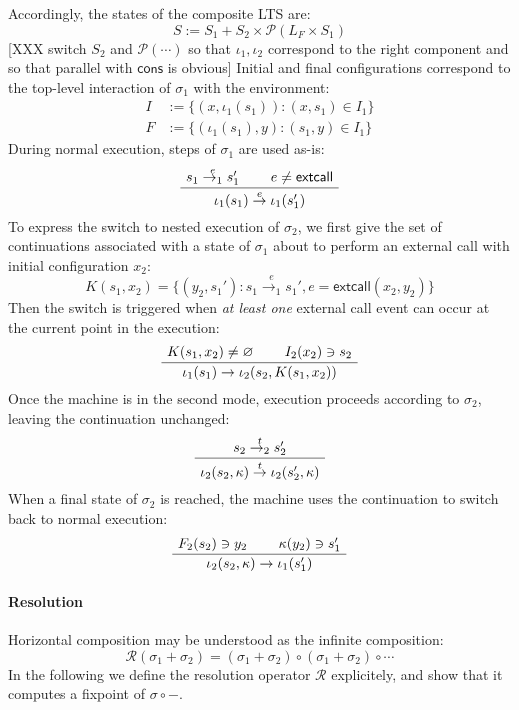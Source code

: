 \documentclass[sigplan,10pt,review,anonymous]{acmart}
\newcommand{\kw}[1]{\ensuremath{ \textsf{#1} }}
\begin{document}
Accordingly,
the states of the composite LTS are:
\[
  S := S_1 + S_2 \times \mathcal{P}(L_F \times S_1)
\]
[XXX switch $S_2$ and $\mathcal{P}(\cdots)$ so that
$\iota_1, \iota_2$ correspond to the right component
and so that parallel with $\kw{cons}$ is obvious]
%
Initial and final configurations
correspond to the top-level interaction of $\sigma_1$ with the environment:
\begin{align*}
  I &:= \{ (x, \iota_1(s_1)) : (x, s_1) \in I_1 \} \\
  F &:= \{ (\iota_1(s_1), y) : (s_1, y) \in I_1 \}
\end{align*}
During normal execution,
steps of $\sigma_1$ are used as-is:
\[
  \AxiomC{$s_1 \stackrel{e}{\rightarrow_1} s_1'$}
  \AxiomC{$e \ne \kw{extcall}$}
  \BinaryInfC{$\iota_1(s_1) \stackrel{e}{\rightarrow} \iota_1(s_1')$}
  \DisplayProof
\]
To express the switch to nested execution of $\sigma_2$,
we first give the set of continuations associated with a state of $\sigma_1$
about to perform an external call with initial configuration $x_2$:
\[
  K(s_1, x_2) =
    \{ (y_2, s_1') : s_1 \stackrel{e}{\rightarrow_1} s_1',
                     e = \kw{extcall}(x_2, y_2) \}
\]
Then the switch is triggered when \emph{at least one} external call event
can occur at the current point in the execution:
\[
  \AxiomC{$K(s_1, x_2) \ne \varnothing$}
  \AxiomC{$I_2(x_2) \ni s_2$}
  \BinaryInfC{$\iota_1(s_1) \rightarrow \iota_2(s_2, K(s_1, x_2))$}
  \DisplayProof
\]
Once the machine is in the second mode,
execution proceeds according to $\sigma_2$,
leaving the continuation unchanged:
\[
  \AxiomC{$s_2 \stackrel{t}{\rightarrow_2} s_2'$}
  \UnaryInfC{$
    \iota_2(s_2, \kappa)
    \stackrel{t}{\rightarrow}
    \iota_2(s_2', \kappa)$}
  \DisplayProof
\]
When a final state of $\sigma_2$ is reached,
the machine uses the continuation to switch back
to normal execution:
\[
  \AxiomC{$F_2(s_2) \ni y_2$}
  \AxiomC{$\kappa(y_2) \ni s_1'$}
  \BinaryInfC{$\iota_2(s_2, \kappa) \rightarrow \iota_1(s_1')$}
  \DisplayProof
\]


\paragraph{Resolution} %

Horizontal composition may be understood as the infinite composition:
\[
  \mathcal{R}(\sigma_1 + \sigma_2) =
    (\sigma_1 + \sigma_2) \circ (\sigma_1 + \sigma_2) \circ \cdots
\]
In the following
we define the resolution operator $\mathcal{R}$ explicitely,
and show that it computes a fixpoint of $\sigma \circ -$.
\end{document}
